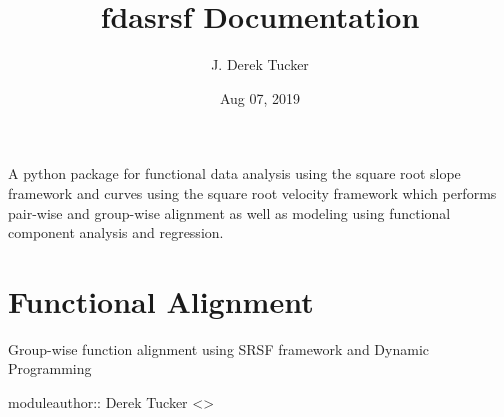 \documentclass[letterpaper,10pt,english]{sphinxmanual}
\title{fdasrsf Documentation}
\date{Aug 07, 2019}
\author{J. Derek Tucker}
\begin{document}
\pagestyle{empty}
\sphinxmaketitle
\pagestyle{plain}
\sphinxtableofcontents
\pagestyle{normal}
\label{\detokenize{index::doc}}


A python package for functional data analysis using the square root
slope framework and curves using the square root velocity framework
which performs pair-wise and group-wise alignment as well as modeling
using functional component analysis and regression.


\chapter{Functional Alignment}
\label{\detokenize{time_warping:module-time_warping}}\label{\detokenize{time_warping:functional-alignment}}\label{\detokenize{time_warping::doc}}
Group-wise function alignment using SRSF framework and Dynamic Programming

moduleauthor:: Derek Tucker \textless{}\textgreater{}
\end{document}
